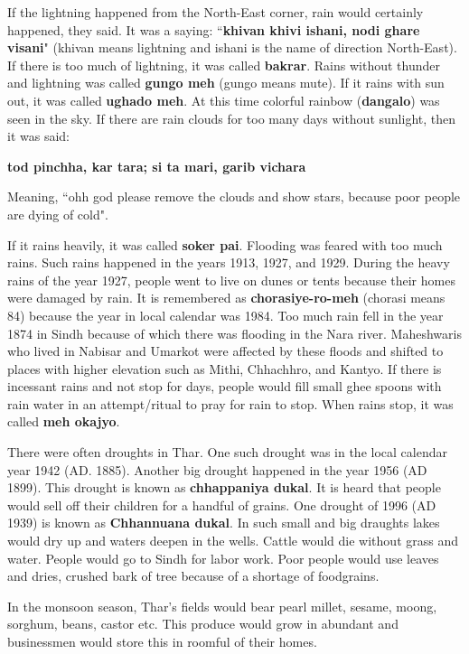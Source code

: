 If the lightning happened from the North-East corner, rain would certainly
happened, they said. It was a saying: ``\textbf{khivan khivi ishani, nodi ghare
visani}" (khivan means lightning and ishani is the name of direction
North-East). If there is too much of lightning, it was called \textbf{bakrar}.
Rains without thunder and lightning was called \textbf{gungo meh} (gungo means
mute). If it rains with sun out, it was called \textbf{ughado meh}. At this
time colorful rainbow (\textbf{dangalo}) was seen in the sky. If there are rain
clouds for too many days without sunlight, then it was said:

\textbf{tod pinchha, kar tara; si ta mari, garib vichara}

Meaning, ``ohh god please remove the clouds and show stars, because poor people
are dying of cold".

If it rains heavily, it was called \textbf{soker pai}. Flooding was feared with
too much rains. Such rains happened in the years 1913, 1927, and 1929. During
the heavy rains of the year 1927, people went to live on dunes or tents because
their homes were damaged by rain. It is remembered as \textbf{chorasiye-ro-meh}
(chorasi means 84) because the year in local calendar was 1984. Too much rain
fell in the year 1874 in Sindh because of which there was flooding in the Nara
river. Maheshwaris who lived in Nabisar and Umarkot were affected by these
floods and shifted to places with higher elevation such as Mithi, Chhachhro,
and Kantyo. If there is incessant rains and not stop for days, people would
fill small ghee spoons with rain water in an attempt/ritual to pray for rain to
stop. When rains stop, it was called \textbf{meh okajyo}. 

There were often droughts in Thar. One such drought was in the local calendar
year 1942 (AD. 1885). Another big drought happened in the year 1956 (AD 1899).
This drought is known as \textbf{chhappaniya dukal}. It is heard that people
would sell off their children for a handful of grains. One drought of 1996 (AD
1939) is known as \textbf{Chhannuana dukal}. In such small and big draughts
lakes would dry up and waters deepen in the wells. Cattle would die without
grass and water. People would go to Sindh for labor work. Poor people would use
leaves and dries, crushed bark of tree because of a shortage of foodgrains. 

In the monsoon season, Thar's fields would bear pearl millet, sesame, moong,
sorghum, beans, castor etc. This produce would grow in abundant and businessmen
would store this in roomful of their homes. 

